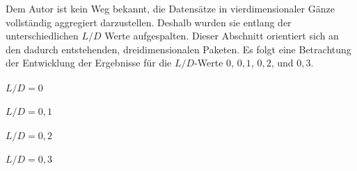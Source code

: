 \label{subsec:results}
Dem Autor ist kein Weg bekannt, die Datensätze in vierdimensionaler Gänze vollständig aggregiert darzustellen. Deshalb wurden sie entlang der unterschiedlichen $L/D$ Werte aufgespalten. Dieser Abschnitt orientiert sich an den dadurch entstehenden, dreidimensionalen Paketen. Es folgt eine Betrachtung der Entwicklung der Ergebnisse für die $L/D$-Werte $0$, $0,1$, $0,2$, und $0,3$.

\paragraph{$L/D = 0$}


\paragraph{$L/D = 0,1$}


\paragraph{$L/D = 0,2$}


\paragraph{$L/D = 0,3$}
